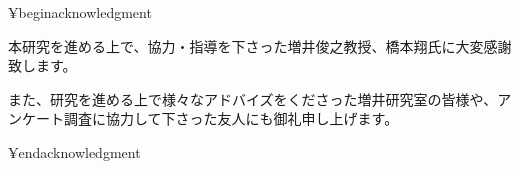 ¥begin{acknowledgment}

本研究を進める上で、協力・指導を下さった増井俊之教授、橋本翔氏に大変感謝致します。

また、研究を進める上で様々なアドバイズをくださった増井研究室の皆様や、アンケート調査に協力して下さった友人にも御礼申し上げます。

¥end{acknowledgment}
